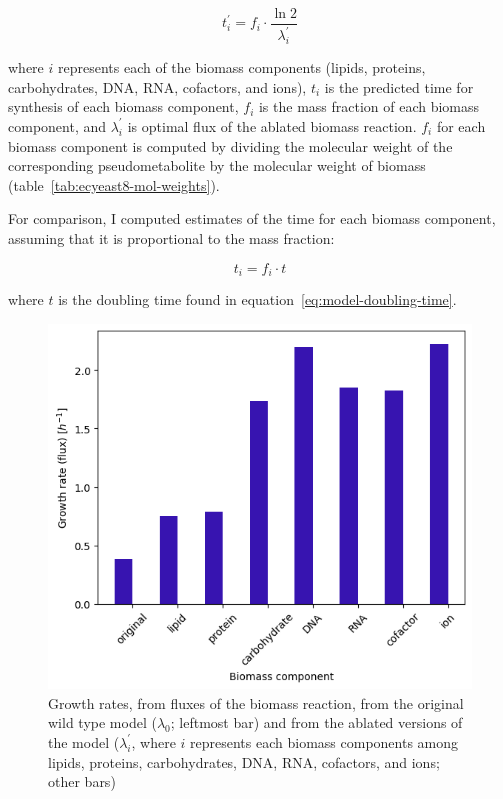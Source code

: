 \begin{equation}
  t_{i}^{\prime} = f_{i} \cdot \frac{\ln 2}{\lambda_{i}^{\prime}}
  \label{eq:model-ablated-time}
\end{equation}

where $i$ represents each of the biomass components (lipids, proteins, carbohydrates, DNA, RNA, cofactors, and ions), $t_{i}$ is the predicted time for synthesis of each biomass component, $f_{i}$ is the mass fraction of each biomass component, and $\lambda_{i}^{\prime}$ is optimal flux of the ablated biomass reaction.
$f_{i}$ for each biomass component is computed by dividing the molecular weight of the corresponding pseudometabolite by the molecular weight of biomass (table~\ref{tab:ecyeast8-mol-weights}).

For comparison, I computed estimates of the time for each biomass component, assuming that it is proportional to the mass fraction:

\begin{equation}
  t_{i} = f_{i} \cdot t
  \label{eq:model-proportional-time}
\end{equation}

where $t$ is the doubling time found in equation~\ref{eq:model-doubling-time}.

\begin{figure}
  \centering
  \includegraphics[width=.9\linewidth]{ablation_example_fluxes.png}
  \caption{
    Growth rates, from fluxes of the biomass reaction, from the original wild type model ($\lambda_{0}$; leftmost bar) and from the ablated versions of the model ($\lambda_{i}^{\prime}$, where $i$ represents each biomass components among lipids, proteins, carbohydrates, DNA, RNA, cofactors, and ions; other bars)
  }
  \label{fig:model-ablate-fluxes}
\end{figure}


